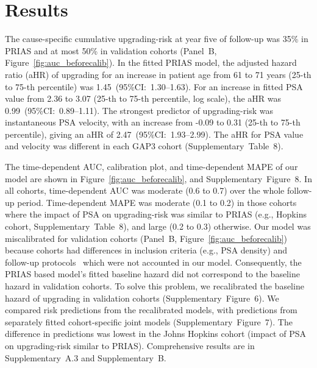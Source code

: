 \section{Results}
The cause-specific cumulative upgrading-risk at year five of follow-up was 35\% in PRIAS and at most 50\% in validation cohorts (Panel~B, Figure~\ref{fig:auc_beforecalib}). In the fitted PRIAS model, the adjusted hazard ratio (aHR) of upgrading for an increase in patient age from 61 to 71 years (25-th to 75-th percentile) was 1.45~(95\%CI:~1.30--1.63). For an increase in fitted PSA value from 2.36 to 3.07 (25-th to 75-th percentile, log scale), the aHR was 0.99~(95\%CI:~0.89--1.11). The strongest predictor of upgrading-risk was instantaneous PSA velocity, with an increase from -0.09 to 0.31 (25-th to 75-th percentile), giving an aHR of 2.47~(95\%CI:~1.93--2.99). The aHR for PSA value and velocity was different in each GAP3 cohort (Supplementary~Table~8).

The time-dependent AUC, calibration plot, and time-dependent MAPE of our model are shown in Figure~\ref{fig:auc_beforecalib}, and Supplementary~Figure~8. In all cohorts, time-dependent AUC was moderate (0.6 to 0.7) over the whole follow-up period. Time-dependent MAPE was moderate (0.1 to 0.2) in those cohorts where the impact of PSA on upgrading-risk was similar to PRIAS (e.g., Hopkins cohort, Supplementary~Table~8), and large (0.2 to 0.3) otherwise. Our model was miscalibrated for validation cohorts (Panel~B, Figure~\ref{fig:auc_beforecalib}) because cohorts had differences in inclusion criteria (e.g., PSA density) and follow-up protocols~\citep{gap3_2018} which were not accounted in our model. Consequently, the PRIAS based model's fitted baseline hazard did not correspond to the baseline hazard in validation cohorts. To solve this problem, we recalibrated the baseline hazard of upgrading in validation cohorts (Supplementary~Figure~6). We compared risk predictions from the recalibrated models, with predictions from separately fitted cohort-specific joint models (Supplementary~Figure~7). The difference in predictions was lowest in the Johns Hopkins cohort (impact of PSA on upgrading-risk similar to PRIAS). Comprehensive results are in Supplementary~A.3 and Supplementary~B.


